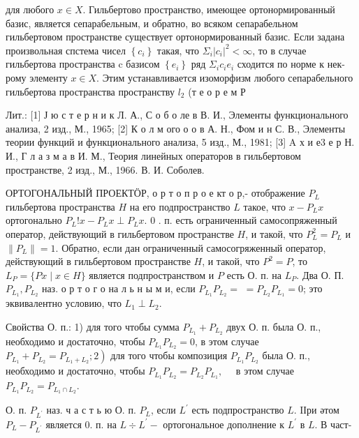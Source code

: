\documentclass[10pt]{article}
\begin{document}
для любого $x \in X$. Гильбертово пространство, имеющее ортонормированный базис, является сепарабельным, и обратно, во всяком сепарабельном гильбертовом пространстве существует ортонормированный базис. Если задана произвольная спстема чисел $\left\{c_{i}\right\}$ такая, что $\Sigma_{i}\left|c_{i}\right|^{2}<\infty$, то в случае гильбертова пространства c базисом $\left\{e_{i}\right\}$ ряд $\Sigma_{i} c_{i} e_{i}$ сходится по норме к нек-рому элементу $x \in X$. Этим устанавливается изоморфизм любого сепарабельного гильбертова пространства пространству $l_{2}$ (т е о р е м Р



Лит.: [1] Ј ю с т е р н и к Л. А., С о б о ле в В. И., Элементы функционального анализа, 2 изд., М., 1965; [2] К о л м ого о о в А. Н., Фом и н С. В., Элементы теории функций и функционального анализа, 5 изд., М., 1981; [3] A х и е3 е р Н. И., Г л а з м а в И. М., Теория линейных операторов в гильбертовом пространстве, 2 изд., М., 1966. В. И. Соболев.



ОРТОГОНАЛЬНЫЙ ПРОЕКТӦР, о р т о п р о е кт о р,- отображение $P_{L}$ гильбертова пространства $H$ на его подпространство $L$ такое, что $x-P_{L} x$ ортогонально $P_{L} ! x-P_{L} x \perp P_{L} x$. 0 . п. есть ограниченный самосопряженный оператор, действующий в гильбертовом пространстве $H$, и такой, что $P_{L}^{2}=P_{L}$ и $\left\|P_{L}\right\|=1$. Обратно, если дан ограниченный самосогряженный оператор, действующий в гильбертовом пространстве $H$, и такой, что $P^{2}=P$, то $L_{P}=\{P x \mid x \in H\}$ является подпространством и $P$ есть $О$. п. на $L_{P}$. Два $О$. П. $P_{L_{1}}, P_{L_{2}}$ наз. о р т о г о на л ь н ы м и, если $P_{L_{1}} P_{L_{2}}=$ $=P_{L_{2}} P_{L_{1}}=0$; это эквивалентно условию, что $L_{1} \perp L_{2}$.



Свойства $О$. п.: 1) для того чтобы сумма $P_{L_{1}}+P_{L_{2}}$ двух О. п. была О. п., необходимо и достаточно, чтобы $P_{L_{1}} P_{L_{2}}=0$, в этом случае $\left.P_{L_{1}}+P_{L_{2}}=P_{L_{1}+L_{2}} ; 2\right)$ для того чтобы композиция $P_{L_{1}} P_{L_{2}}$ была О. п., необходимо и достаточно, чтобы $P_{L_{1}} P_{L_{2}}=P_{L_{2}} P_{L_{1}}, \quad$ в этом случае $P_{L_{1}} P_{L_{2}}=P_{L_{1} \cap L_{2}}$.



О. п. $P_{L^{\prime}}$ наз. ч а с т ь ю О. п. $P_{L}$, если $L^{\prime}$ есть подпространство $L$. IІри әтом $P_{L}-P_{L^{\prime}}$ является 0. п. на $L \div L^{\prime}-$ ортогональное дополнение к $L^{\prime}$ в $L$. В част-
\end{document}
